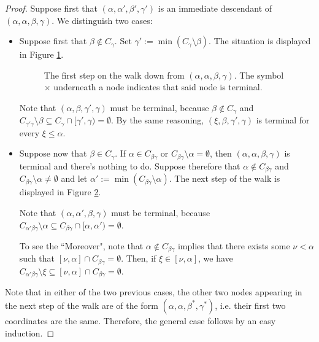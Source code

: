 \documentclass{amsart}
\numberwithin{theorem}{section}
\theoremstyle{definition}
\renewcommand{\subset}{\subseteq}
\begin{document}
\begin{proof}
Suppose first that $(\alpha,\alpha',\beta',\gamma')$ is an immediate descendant of $(\alpha,\alpha,\beta,\gamma)$. We distinguish two cases:

\begin{itemize}
\item Suppose first that $\beta\not\in C_\gamma$. Set $\gamma':=\min(C_\gamma\setminus\beta)$. The situation is displayed in Figure \ref{alphaAlphaTerminal1}.

\begin{figure}[ht]
\caption{The first step on the walk down from $(\alpha,\alpha,\beta,\gamma)$. The symbol $\times$ underneath a node indicates that said node is terminal.}
\label{alphaAlphaTerminal1}
\end{figure}
Note that $(\alpha,\beta,\gamma',\gamma)$ must be terminal, because $\beta\not\in C_\gamma$ and $C_{\gamma'\gamma}\setminus\beta \subset C_\gamma \cap [\gamma',\gamma)=\emptyset$. By the same reasoning, $(\xi,\beta,\gamma',\gamma)$ is terminal for every $\xi\le \alpha$.

\item Suppose now that $\beta\in C_{\gamma}$. If $\alpha\in C_{\beta\gamma}$ or $C_{\beta\gamma}\setminus\alpha=\emptyset$, then $(\alpha,\alpha,\beta,\gamma)$ is terminal and there's nothing to do. Suppose therefore that $\alpha\not\in C_{\beta\gamma}$ and $C_{\beta\gamma}\setminus\alpha\neq\emptyset$ and let $\alpha':=\min(C_{\beta\gamma}\setminus\alpha)$. The next step of the walk is displayed in Figure \ref{alphaAlphaTerminal2}.

\begin{figure}[ht]
\caption{}
\label{alphaAlphaTerminal2}
\end{figure}
Note that $(\alpha,\alpha',\beta,\gamma)$ must be terminal, because $C_{\alpha'\beta\gamma}\setminus\alpha\subset C_{\beta\gamma}\cap [\alpha,\alpha')=\emptyset$.

To see the ``Moreover", note that $\alpha\not\in C_{\beta\gamma}$ implies that there exists some $\nu<\alpha$ such that $[\nu,\alpha]\cap C_{\beta\gamma}=\emptyset$. Then, if $\xi \in [\nu,\alpha]$, we have $C_{\alpha'\beta\gamma}\setminus \xi\subset [\nu,\alpha]\cap C_{\beta\gamma}=\emptyset$.
\end{itemize}
Note that in either of the two previous cases, the other two nodes appearing in the next step of the walk are of the form $(\alpha,\alpha,\beta^*,\gamma^*)$, i.e. their first two coordinates are the same. Therefore, the general case follows by an easy induction.
\end{proof}
\end{document}
